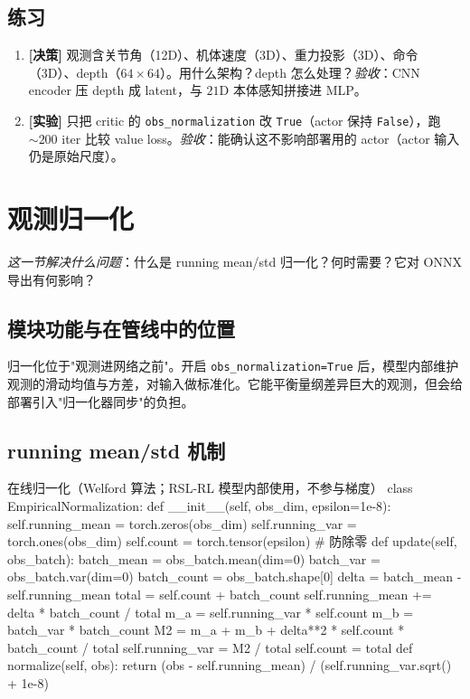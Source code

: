 \subsection{练习}

\begin{practice}[架构决策与对比]
\begin{enumerate}
  \item \textbf{[决策]} 观测含关节角（12D）、机体速度（3D）、重力投影（3D）、命令（3D）、depth（$64\times64$）。用什么架构？depth 怎么处理？\emph{验收}：CNN encoder 压 depth 成 latent，与 $21$D 本体感知拼接进 MLP。
  \item \textbf{[实验]} 只把 critic 的 \verb|obs_normalization| 改 \verb|True|（actor 保持 \verb|False|），跑 $\sim200$ iter 比较 value loss。\emph{验收}：能确认这不影响部署用的 actor（actor 输入仍是原始尺度）。
\end{enumerate}
\end{practice}

\section{观测归一化}
\label{sec:rlmc-train-obsnorm}

\emph{这一节解决什么问题}：什么是 running mean/std 归一化？何时需要？它对 ONNX 导出有何影响？

\subsection{模块功能与在管线中的位置}

归一化位于"观测进网络之前"。开启 \verb|obs_normalization=True| 后，模型内部维护观测的滑动均值与方差，对输入做标准化。它能平衡量纲差异巨大的观测，但会给部署引入"归一化器同步"的负担。

\subsection{running mean/std 机制}

\begin{codebox}[Python]{在线归一化（Welford 算法；RSL-RL 模型内部使用，不参与梯度）}
class EmpiricalNormalization:
    def __init__(self, obs_dim, epsilon=1e-8):
        self.running_mean = torch.zeros(obs_dim)
        self.running_var  = torch.ones(obs_dim)
        self.count = torch.tensor(epsilon)            # 防除零
    def update(self, obs_batch):
        batch_mean = obs_batch.mean(dim=0)
        batch_var  = obs_batch.var(dim=0)
        batch_count = obs_batch.shape[0]
        delta = batch_mean - self.running_mean
        total = self.count + batch_count
        self.running_mean += delta * batch_count / total
        m_a = self.running_var * self.count
        m_b = batch_var * batch_count
        M2 = m_a + m_b + delta**2 * self.count * batch_count / total
        self.running_var = M2 / total
        self.count = total
    def normalize(self, obs):
        return (obs - self.running_mean) / (self.running_var.sqrt() + 1e-8)
\end{codebox}

